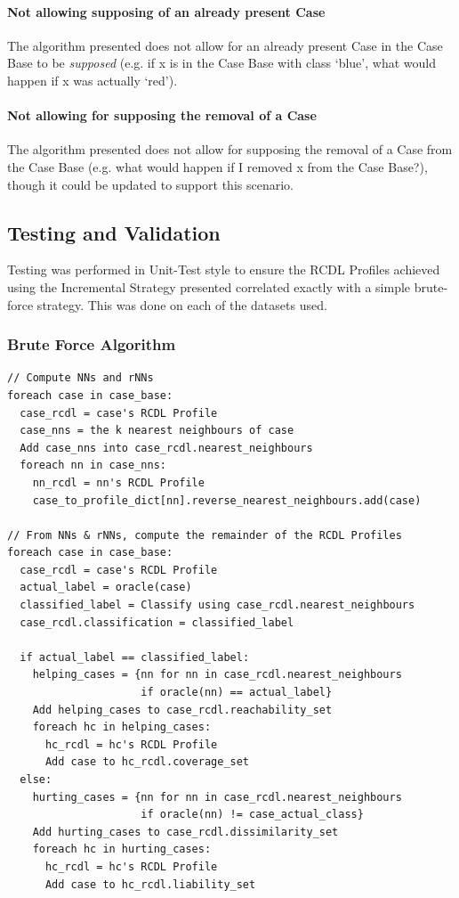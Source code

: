 \documentclass[a4paper,11pt]{report}
\begin{document}
\paragraph{Not allowing supposing of an already present Case}
The algorithm presented does not allow for an already present Case in the Case Base to be \emph{supposed} (e.g. if x is in the Case Base with class `blue', what would happen if x was actually `red').

\paragraph{Not allowing for supposing the removal of a Case}
The algorithm presented does not allow for supposing the removal of a Case from the Case Base (e.g. what would happen if I removed x from the Case Base?), though it could be updated to support this scenario.

\subsection{Testing and Validation}
Testing was performed in Unit-Test style to ensure the RCDL Profiles achieved using the Incremental Strategy presented correlated exactly with a simple brute-force strategy. This was done on each of the datasets used.

\vspace{10pt}

\begin{samepage}
\subsubsection{Brute Force Algorithm}
\begin{verbatim}
// Compute NNs and rNNs
foreach case in case_base:
  case_rcdl = case's RCDL Profile
  case_nns = the k nearest neighbours of case
  Add case_nns into case_rcdl.nearest_neighbours
  foreach nn in case_nns:
    nn_rcdl = nn's RCDL Profile
    case_to_profile_dict[nn].reverse_nearest_neighbours.add(case)

// From NNs & rNNs, compute the remainder of the RCDL Profiles
foreach case in case_base:
  case_rcdl = case's RCDL Profile
  actual_label = oracle(case)
  classified_label = Classify using case_rcdl.nearest_neighbours
  case_rcdl.classification = classified_label
  
  if actual_label == classified_label:
    helping_cases = {nn for nn in case_rcdl.nearest_neighbours 
                     if oracle(nn) == actual_label}
    Add helping_cases to case_rcdl.reachability_set
    foreach hc in helping_cases:
      hc_rcdl = hc's RCDL Profile
      Add case to hc_rcdl.coverage_set
  else:
    hurting_cases = {nn for nn in case_rcdl.nearest_neighbours 
                     if oracle(nn) != case_actual_class}
    Add hurting_cases to case_rcdl.dissimilarity_set
    foreach hc in hurting_cases:
      hc_rcdl = hc's RCDL Profile
      Add case to hc_rcdl.liability_set
\end{verbatim}
\end{samepage}
\end{document}
